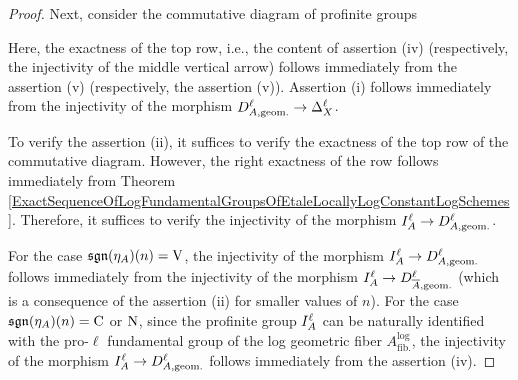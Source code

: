 \begin{proof}
  Next, consider the commutative diagram of profinite groups
  \begin{center}
  \end{center}
  Here, the exactness of the top row, i.e., the content of assertion (iv) (respectively, the injectivity of the middle vertical arrow) follows immediately from the assertion (v) (respectively, the assertion (v)). Assertion (i) follows immediately from the injectivity of the morphism $D^{\ell}_{A, \text{geom.}} \to \Delta_{X}^\ell$.

  To verify the assertion (ii), it suffices to verify the exactness of the top row of the commutative diagram. However, the right exactness of the row follows immediately from Theorem \ref{ExactSequenceOfLogFundamentalGroupsOfEtaleLocallyLogConstantLogSchemes}. Therefore, it suffices to verify the injectivity of the morphism $I^{\ell}_{A} \to D^{\ell}_{A, \text{geom.}}$. 
  
  For the case $\mathfrak{sgn}(\eta_A)(n) = \mathrm{V}$, the injectivity of the morphism $I^{\ell}_{A} \to D^{\ell}_{A, \text{geom.}}$ follows immediately from the injectivity of the morphism $I^{\ell}_{A} \to D^{\ell}_{\overline{A}, \text{geom.}}$ (which is a consequence of the assertion (ii) for smaller values of $n$). For the case $\mathfrak{sgn}(\eta_A)(n) = \mathrm{C}$ or $\mathrm{N}$, since the profinite group $I^{\ell}_{A}$ can be naturally identified with the pro-$\ell$ fundamental group of the log geometric fiber $A_\text{fib.}^\log$, the injectivity of the morphism $I^{\ell}_{A} \to D^{\ell}_{A, \text{geom.}}$ follows immediately from the assertion (iv).


\end{proof}
